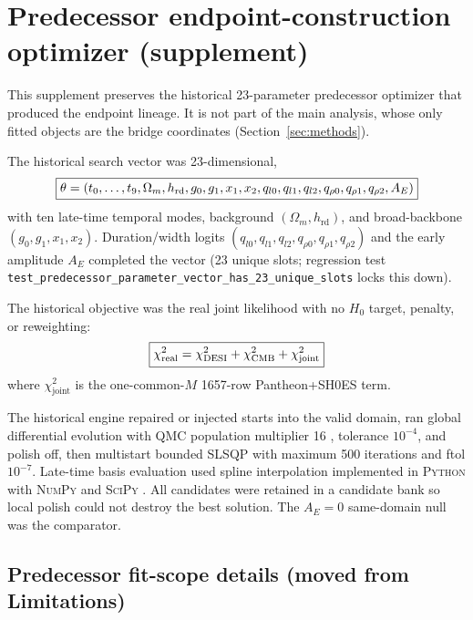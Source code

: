 \section{Predecessor endpoint-construction optimizer (supplement)}
\label{sec:predecessor-R}

This supplement preserves the historical 23-parameter predecessor
optimizer that produced the endpoint lineage. It is not part of the
main analysis, whose only fitted objects are the bridge coordinates
(Section~\ref{sec:methods}).

The historical search vector was 23-dimensional,
\begin{equation}
  \boxed{%
    \theta = (t_{0},\dots,t_{9},\Omega_{m},h_{\mathrm{rd}},
    g_{0},g_{1},x_{1},x_{2},
    q_{l0},q_{l1},q_{l2},q_{\rho0},q_{\rho1},q_{\rho2},A_{E})%
  }
  \label{eq:theta-historical}
\end{equation}
with ten late-time temporal modes, background $(\Omega_{m},h_{\mathrm{rd}})$,
and broad-backbone $(g_{0},g_{1},x_{1},x_{2})$. Duration/width logits
$(q_{l0},q_{l1},q_{l2},q_{\rho0},q_{\rho1},q_{\rho2})$ and the early
amplitude $A_{E}$ completed the vector (23 unique slots; regression
test \texttt{test\_predecessor\_parameter\_vector\_has\_23\_unique\_slots}
locks this down).

The historical objective was the real joint likelihood with no $H_{0}$ target,
penalty, or reweighting:
\begin{equation}
  \boxed{%
    \chi^{2}_{\mathrm{real}}
    = \chi^{2}_{\mathrm{DESI}} + \chi^{2}_{\mathrm{CMB}}
    + \chi^{2}_{\mathrm{joint}}%
  }
  \label{eq:chireal-historical}
\end{equation}
where $\chi^{2}_{\mathrm{joint}}$ is the one-common-$M$ 1657-row
Pantheon+SH0ES term.

The historical engine repaired or injected starts into the valid
domain, ran global differential evolution \citep{Storn1997} with QMC
population multiplier 16 \citep{Sobol1967}, tolerance $10^{-4}$, and
polish off, then multistart bounded SLSQP \citep{Kraft1988} with
maximum 500 iterations and ftol $10^{-7}$. Late-time basis evaluation
used spline interpolation \citep{deBoor1978} implemented in
\textsc{Python} with \textsc{NumPy} \citep{Harris2020} and
\textsc{SciPy} \citep{Virtanen2020}. All candidates were retained in a
candidate bank so local polish could not destroy the best solution.
The $A_{E}=0$ same-domain null was the comparator.

\subsection{Predecessor fit-scope details (moved from Limitations)}
\label{sec:predecessor-fit-scope}

